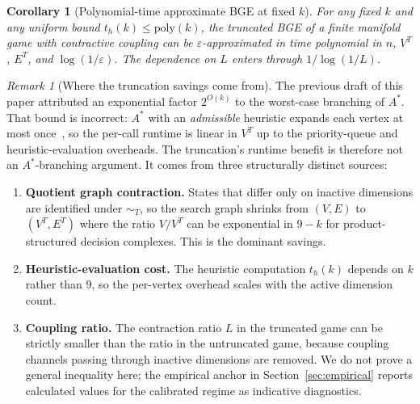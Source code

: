 \documentclass[11pt]{article}
\newtheorem{corollary}[theorem]{Corollary}
\theoremstyle{definition}
\theoremstyle{remark}
\newtheorem{remark}[theorem]{Remark}
\begin{document}
\begin{corollary}[Polynomial-time approximate BGE at fixed $k$]
\label{cor:polytime}
For any fixed $k$ and any uniform bound $t_h(k) \leq \mathrm{poly}(k)$, the truncated BGE of a finite
manifold game with contractive coupling can be $\varepsilon$-approximated in time polynomial in $n$,
$V^T$, $E^T$, and $\log(1/\varepsilon)$. The dependence on $L$ enters through $1/\log(1/L)$.
\end{corollary}

\begin{remark}[Where the truncation savings come from]
\label{rem:savings}
The previous draft of this paper attributed an exponential factor $2^{O(k)}$ to the worst-case
branching of $A^*$. That bound is incorrect: $A^*$ with an \emph{admissible} heuristic expands each
vertex at most once~\cite{hart1968}, so the per-call runtime is linear in $V^T$ up to the
priority-queue and heuristic-evaluation overheads. The truncation's runtime benefit is therefore not
an $A^*$-branching argument. It comes from three structurally distinct sources:
\begin{enumerate}[label=(\alph*)]
\item \textbf{Quotient graph contraction.} States that differ only on inactive dimensions are identified
under $\sim_T$, so the search graph shrinks from $(V, E)$ to $(V^T, E^T)$ where the ratio $V/V^T$ can
be exponential in $9-k$ for product-structured decision complexes. This is the dominant savings.
\item \textbf{Heuristic-evaluation cost.} The heuristic computation $t_h(k)$ depends on $k$ rather than
$9$, so the per-vertex overhead scales with the active dimension count.
\item \textbf{Coupling ratio.} The contraction ratio $L$ in the truncated game can be strictly
smaller than the ratio in the untruncated game, because coupling channels passing through inactive
dimensions are removed. We do not prove a general inequality here; the empirical anchor in
Section~\ref{sec:empirical} reports calculated values for the calibrated regime as indicative
diagnostics.
\end{enumerate}
\end{remark}
\end{document}
